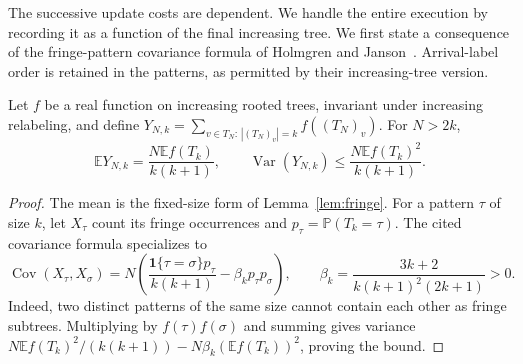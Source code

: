 \documentclass[runningheads,envcountsame,orivec]{llncs}
\newcommand{\E}{\mathbb E}
\newcommand{\PP}{\mathbb P}
\newcommand{\ind}{\mathbf 1}
\begin{document}
The successive update costs are dependent. We handle the entire
execution by recording it as a function of the final increasing tree.
We first state a consequence of the fringe-pattern covariance formula
of Holmgren and Janson~\cite{HolmgrenJanson2015}. Arrival-label order is
retained in the patterns, as permitted by their increasing-tree version.

\begin{lemma}\label{lem:fringevariance}
Let $f$ be a real function on increasing rooted trees, invariant under
increasing relabeling, and define
$Y_{N,k}=\sum_{v\in T_N:\,|(T_N)_v|=k}f((T_N)_v)$.
For $N>2k$,
\[
 \E Y_{N,k}=\frac{N\E f(T_k)}{k(k+1)},\qquad
 \operatorname{Var}(Y_{N,k})\le
       \frac{N\E f(T_k)^2}{k(k+1)}.
\]
\end{lemma}
\begin{proof}
The mean is the fixed-size form of Lemma~\ref{lem:fringe}. For a
pattern $\tau$ of size $k$, let $X_\tau$ count its fringe occurrences
and $p_\tau=\PP(T_k=\tau)$. The cited covariance formula specializes to
\[
 \operatorname{Cov}(X_\tau,X_\sigma)
 =N\left(\frac{\ind\{\tau=\sigma\}p_\tau}{k(k+1)}
          -\beta_kp_\tau p_\sigma\right),\qquad
 \beta_k=\frac{3k+2}{k(k+1)^2(2k+1)}>0.
\]
Indeed, two distinct patterns of the same size cannot contain each
other as fringe subtrees. Multiplying by $f(\tau)f(\sigma)$ and summing
gives variance
$N\E f(T_k)^2/(k(k+1))-N\beta_k(\E f(T_k))^2$, proving the bound.
\end{proof}
\end{document}
